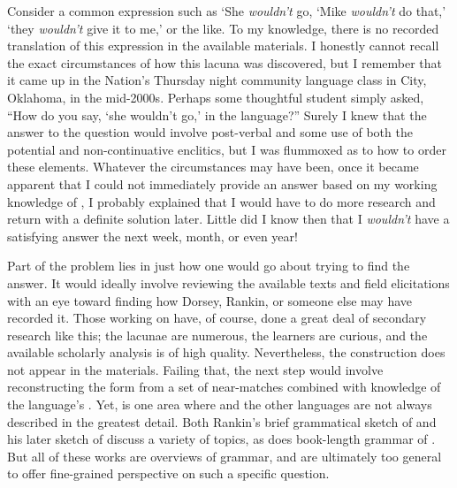 \documentclass[output=paper]{LSP/langsci}
\begin{document}
Consider a common  expression such as `She \textit{wouldn't} go, `Mike \textit{wouldn't} do that,' `they \textit{wouldn't} give it to me,' or the like. To my knowledge, there is no recorded translation of this expression in the available  materials. I honestly cannot recall the exact circumstances of how this lacuna was discovered, but I remember that it came up in the  Nation's Thursday night community language class in  City, Oklahoma, in the mid-2000s. Perhaps some thoughtful student simply asked, ``How do you say, `she wouldn't go,' in the language?'' Surely I knew that the answer to the question would involve post-verbal  and some use of both the potential and non-continuative enclitics, but I was flummoxed as to how to order these elements. Whatever the circumstances may have been, once it became apparent that I could not immediately provide an answer based on my working knowledge of  , I probably explained that I would have to do more research and return with a definite solution later. Little did I know then that I \textit{wouldn't} have a satisfying answer the next week, month, or even year!

Part of the problem lies in just how one would go about trying to find the answer. It would ideally involve reviewing the available texts and field elicitations with an eye toward finding how Dorsey, Rankin, or someone else may have recorded it. Those working on  have, of course, done a great deal of secondary research like this; the lacunae are numerous, the learners are curious, and the available scholarly analysis is of high quality. Nevertheless, the construction does not appear in the materials. Failing that, the next step would involve reconstructing the form from a set of near-matches combined with knowledge of the language's . Yet,  is one area where  and the other  languages are not always described in the greatest detail. Both Rankin's brief grammatical sketch of  \citeyear{Rankin1989} and his later sketch of  \citeyear{Rankin2005b} discuss a variety of  topics, as does  book-length grammar of . But all of these works are overviews of  grammar, and are ultimately too general to offer fine-grained perspective on such a specific question. 
\end{document}

